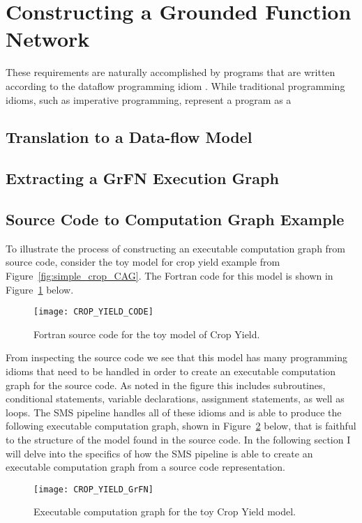 \section{Constructing a Grounded Function Network \label{sec:grfn_assembly}}
These requirements are naturally accomplished by programs that are written according to the dataflow programming idiom \citep{johnston2004dataflowadvances}.
While traditional programming idioms, such as imperative programming, represent a program as a
\subsection{Translation to a Data-flow Model \label{sec:trans_to_dfm}}
\subsection{Extracting a GrFN Execution Graph \label{sec:exec_graph_extraction}}
\subsection{Source Code to Computation Graph Example\label{sec:code_to_grfn}}
To illustrate the process of constructing an executable computation graph from source code, consider the toy model for crop yield example from Figure~\ref{fig:simple_crop_CAG}.
The Fortran code for this model is shown in Figure~\ref{crop_code} below.
\FloatBarrier
\begin{figure}[!htbp]
    \label{crop_code}
    \centering
    \texttt{[image: CROP\_YIELD\_CODE]}%
    \caption[Crop Yield Model Source Code]{Fortran source code for the toy model of Crop Yield.}
\end{figure}
\FloatBarrier

From inspecting the source code we see that this model has many programming idioms that need to be handled in order to create an executable computation graph for the source code.
As noted in the figure this includes subroutines, conditional statements, variable declarations, assignment statements, as well as loops.
The SMS pipeline handles all of these idioms and is able to produce the following executable computation graph, shown in Figure~\ref{crop_grfn_cg} below, that is faithful to the structure of the model found in the source code. In the following section I will delve into the specifics of how the SMS pipeline is able to create an executable computation graph from a source code representation.

\FloatBarrier
\begin{figure}[!htbp]
    \label{crop_grfn_cg}
    \centering
    \texttt{[image: CROP\_YIELD\_GrFN]}%
    \caption[Crop Yield Model GrFN CG]{Executable computation graph for the toy Crop Yield model.}
\end{figure}
\FloatBarrier





